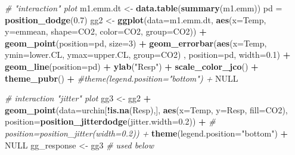 \documentclass[]{book}
\newenvironment{Shaded}{\begin{snugshade}}{\end{snugshade}}
\newcommand{\CommentTok}[1]{\textcolor[rgb]{0.56,0.35,0.01}{\textit{#1}}}
\newcommand{\DataTypeTok}[1]{\textcolor[rgb]{0.13,0.29,0.53}{#1}}
\newcommand{\DecValTok}[1]{\textcolor[rgb]{0.00,0.00,0.81}{#1}}
\newcommand{\FloatTok}[1]{\textcolor[rgb]{0.00,0.00,0.81}{#1}}
\newcommand{\KeywordTok}[1]{\textcolor[rgb]{0.13,0.29,0.53}{\textbf{#1}}}
\newcommand{\NormalTok}[1]{#1}
\newcommand{\OperatorTok}[1]{\textcolor[rgb]{0.81,0.36,0.00}{\textbf{#1}}}
\newcommand{\OtherTok}[1]{\textcolor[rgb]{0.56,0.35,0.01}{#1}}
\newcommand{\StringTok}[1]{\textcolor[rgb]{0.31,0.60,0.02}{#1}}
\begin{document}
\begin{Shaded}
\begin{Highlighting}[]
\CommentTok{# "interaction" plot}
\NormalTok{m1.emm.dt <-}\StringTok{ }\KeywordTok{data.table}\NormalTok{(}\KeywordTok{summary}\NormalTok{(m1.emm))}
\NormalTok{pd =}\StringTok{ }\KeywordTok{position_dodge}\NormalTok{(}\FloatTok{0.7}\NormalTok{)}
\NormalTok{gg2 <-}\StringTok{ }\KeywordTok{ggplot}\NormalTok{(}\DataTypeTok{data=}\NormalTok{m1.emm.dt, }
                      \KeywordTok{aes}\NormalTok{(}\DataTypeTok{x=}\NormalTok{Temp, }
                          \DataTypeTok{y=}\NormalTok{emmean, }
                          \DataTypeTok{shape=}\NormalTok{CO2, }
                          \DataTypeTok{color=}\NormalTok{CO2, }
                          \DataTypeTok{group=}\NormalTok{CO2)) }\OperatorTok{+}
\StringTok{  }\KeywordTok{geom_point}\NormalTok{(}\DataTypeTok{position=}\NormalTok{pd, }\DataTypeTok{size=}\DecValTok{3}\NormalTok{) }\OperatorTok{+}
\StringTok{  }\KeywordTok{geom_errorbar}\NormalTok{(}\KeywordTok{aes}\NormalTok{(}\DataTypeTok{x=}\NormalTok{Temp, }
                                 \DataTypeTok{ymin=}\NormalTok{lower.CL, }
                                 \DataTypeTok{ymax=}\NormalTok{upper.CL,}
                                 \DataTypeTok{group=}\NormalTok{CO2)}
\NormalTok{                , }\DataTypeTok{position=}\NormalTok{pd, }\DataTypeTok{width=}\FloatTok{0.1}\NormalTok{) }\OperatorTok{+}
\StringTok{  }\KeywordTok{geom_line}\NormalTok{(}\DataTypeTok{position=}\NormalTok{pd) }\OperatorTok{+}
\StringTok{  }\KeywordTok{ylab}\NormalTok{(}\StringTok{"Resp"}\NormalTok{) }\OperatorTok{+}
\StringTok{  }\KeywordTok{scale_color_jco}\NormalTok{() }\OperatorTok{+}
\StringTok{  }\KeywordTok{theme_pubr}\NormalTok{() }\OperatorTok{+}
\StringTok{  }\CommentTok{#theme(legend.position="bottom") +}
\StringTok{  }\OtherTok{NULL}

\CommentTok{# interaction "jitter" plot}
\NormalTok{gg3 <-}\StringTok{ }\NormalTok{gg2 }\OperatorTok{+}
\StringTok{  }\KeywordTok{geom_point}\NormalTok{(}\DataTypeTok{data=}\NormalTok{urchin[}\OperatorTok{!}\KeywordTok{is.na}\NormalTok{(Resp),], }\KeywordTok{aes}\NormalTok{(}\DataTypeTok{x=}\NormalTok{Temp, }\DataTypeTok{y=}\NormalTok{Resp, }\DataTypeTok{fill=}\NormalTok{CO2),}
             \DataTypeTok{position=}\KeywordTok{position_jitterdodge}\NormalTok{(}\DataTypeTok{jitter.width=}\FloatTok{0.2}\NormalTok{)) }\OperatorTok{+}
\CommentTok{#             position=position_jitter(width=0.2)) +}
\StringTok{  }\KeywordTok{theme}\NormalTok{(}\DataTypeTok{legend.position=}\StringTok{"bottom"}\NormalTok{) }\OperatorTok{+}
\StringTok{  }\OtherTok{NULL}
\NormalTok{gg_response <-}\StringTok{ }\NormalTok{gg3 }\CommentTok{# used below}


\end{Highlighting}
\end{Shaded}
\end{document}

